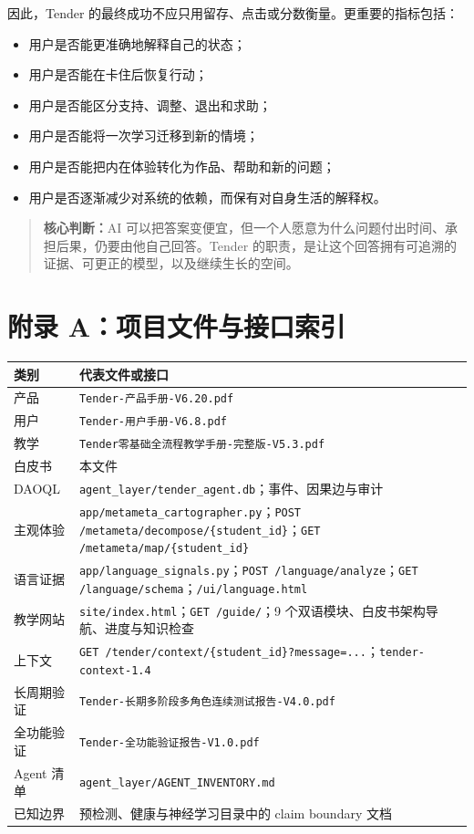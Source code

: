 \documentclass[UTF8,a4paper,11pt]{ctexart}
\newcommand{\keypoint}[1]{\begin{quote}\noindent\textbf{\color{TenderBlue}核心判断：}#1\end{quote}}
\begin{document}
因此，Tender 的最终成功不应只用留存、点击或分数衡量。更重要的指标包括：

\begin{itemize}
\item 用户是否能更准确地解释自己的状态；
\item 用户是否能在卡住后恢复行动；
\item 用户是否能区分支持、调整、退出和求助；
\item 用户是否能将一次学习迁移到新的情境；
\item 用户是否能把内在体验转化为作品、帮助和新的问题；
\item 用户是否逐渐减少对系统的依赖，而保有对自身生活的解释权。
\end{itemize}

\keypoint{AI 可以把答案变便宜，但一个人愿意为什么问题付出时间、承担后果，仍要由他自己回答。Tender 的职责，是让这个回答拥有可追溯的证据、可更正的模型，以及继续生长的空间。}

\newpage
\appendix
\section{附录 A：项目文件与接口索引}

\begin{center}
\begin{longtable}{@{}p{4.2cm}p{8.8cm}@{}}
\toprule
\textbf{类别} & \textbf{代表文件或接口} \\
\midrule
产品 & \texttt{Tender-产品手册-V6.20.pdf} \\
用户 & \texttt{Tender-用户手册-V6.8.pdf} \\
教学 & \texttt{Tender零基础全流程教学手册-完整版-V5.3.pdf} \\
白皮书 & 本文件 \\
DAOQL & \texttt{agent\_layer/tender\_agent.db}；事件、因果边与审计 \\
主观体验 & \texttt{app/metameta\_cartographer.py}；\texttt{POST /metameta/decompose/\{student\_id\}}；\texttt{GET /metameta/map/\{student\_id\}} \\
语言证据 & \texttt{app/language\_signals.py}；\texttt{POST /language/analyze}；\texttt{GET /language/schema}；\texttt{/ui/language.html} \\
教学网站 & \texttt{site/index.html}；\texttt{GET /guide/}；9 个双语模块、白皮书架构导航、进度与知识检查 \\
上下文 & \texttt{GET /tender/context/\{student\_id\}?message=...}；\texttt{tender-context-1.4} \\
长周期验证 & \texttt{Tender-长期多阶段多角色连续测试报告-V4.0.pdf} \\
全功能验证 & \texttt{Tender-全功能验证报告-V1.0.pdf} \\
Agent 清单 & \texttt{agent\_layer/AGENT\_INVENTORY.md} \\
已知边界 & 预检测、健康与神经学习目录中的 claim boundary 文档 \\
\bottomrule
\end{longtable}
\end{center}
\end{document}
